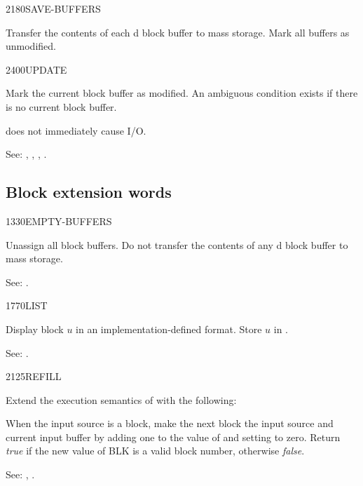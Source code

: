 \begin{newword}{2180}{SAVE-BUFFERS}
	\stack{}{}

	Transfer the contents of each d block buffer to
	mass storage. Mark all buffers as unmodified.
\end{newword}


\begin{newword}{2400}{UPDATE}
	\stack{}{}

	Mark the current block buffer as modified. An ambiguous
	condition exists if there is no current block buffer.

	 does not immediately cause I/O.

\item[See:]
	,
	,
	,
	.
\end{newword}


\subsection{Block extension words} %
\extended

\begin{newword}{1330}{EMPTY-BUFFERS}
	\stack{}{}

	Unassign all block buffers. Do not transfer the contents of
	any d block buffer to mass storage.

\item[See:]
	.
\end{newword}


\begin{newword}{1770}{LIST}

	Display block $u$ in an implementation-defined format.
	Store $u$ in .

\item[See:]
	.
\end{newword}


\begin{newword}{2125}{REFILL}

	Extend the execution semantics of 
	with the following:

	When the input source is a block, make the next block the input
	source and current input buffer by adding one to the value of
	 and setting  to zero. Return
	\emph{true} if the new value of BLK is a valid block number,
	otherwise \emph{false}.

\item[See:]
	,
	.
\end{newword}


